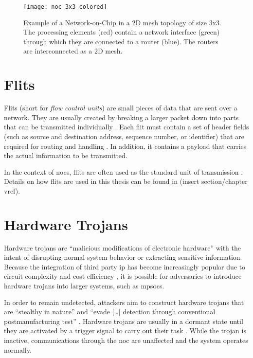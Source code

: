 \begin{figure}
    \centering
    \texttt{[image: noc\_3x3\_colored]}
    \caption[Example of a 3x3 mesh NoC]{Example of a Network-on-Chip in a 2D mesh topology of size 3x3. The processing elements (red) contain a network interface
    (green) through which they are connected to a router (blue). The routers are interconnected as a 2D mesh.}
    \label{fig:nocexample}
\end{figure}

\section{Flits}\label{sec:flits}
Flits (short for \textit{flow control units}) are small pieces of data that are sent over a network. They are usually created by breaking a larger
packet down into parts that can be transmitted individually \cite[6]{flitslecturecmu}. Each flit must contain a set of header fields (such as source and
destination address, sequence number, or identifier) that are required for routing and handling \cite[2]{flitslectureutah}. In addition, it contains
a payload that carries the actual information to be transmitted.

In the context of \glspl{noc}, flits are often used as the standard unit of transmission \cite[51\psqq]{tatas16designingnocs}. Details on how flits
are used in this thesis can be found in (insert section/chapter vref).

\section{Hardware Trojans}\label{sec:hardwaretrojans}
Hardware trojans are \enquote{malicious modifications of electronic hardware} \cite[1]{bhunia14hardwaretrojans} with the intent of disrupting normal
system behavior or extracting sensitive information. Because the integration of third party \gls{ip} has become increasingly popular due to circuit
complexity and cost efficiency \cites[1]{ancajas14fortnocs}[2]{bhunia14hardwaretrojans}, it is possible for adversaries to introduce hardware
trojans into larger systems, such as \glspl{mpsoc}.

In order to remain undetected, attackers aim to construct hardware trojans that are \enquote{stealthy in nature} \cite[1]{bhunia14hardwaretrojans}
and \enquote{evade […] detection through conventional postmanufacturing test} \cite[1]{bhunia14hardwaretrojans}. Hardware trojans are usually in a
dormant state until they are activated by a trigger signal to carry out their task \cites{bhunia14hardwaretrojans}{ancajas14fortnocs}. While the
trojan is inactive, communications through the \gls{noc} are unaffected and the system operates normally.

